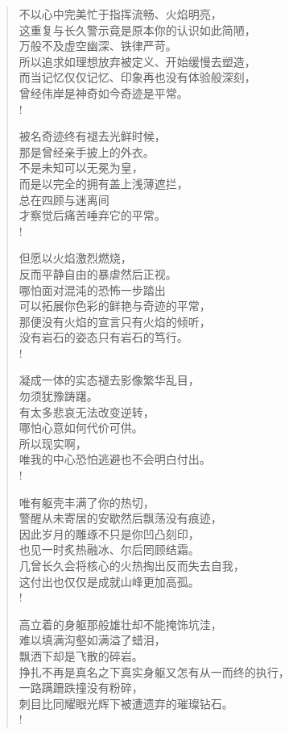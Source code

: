 \documentclass[UTF8, 12pt, a4paper]{ctexrep} %
\begin{document}
\begin{verse}

    不以心中完美忙于指挥流畅、火焰明亮，\\
    这重复与长久警示竟是原本你的认识如此简陋，\\
    万般不及虚空幽深、铁律严苛。\\
    所以追求如理想放弃被定义、开始缓慢去塑造，\\
    而当记忆仅仅记忆、印象再也没有体验般深刻，\\
    曾经伟岸是神奇如今奇迹是平常。\\!

    被名奇迹终有褪去光鲜时候，\\
    那是曾经亲手披上的外衣。\\
    不是未知可以无冕为皇，\\
    而是以完全的拥有盖上浅薄遮拦，\\
    总在四顾与迷离间\\
    才察觉后痛苦唾弃它的平常。\\!

    但愿以火焰激烈燃烧，\\
    反而平静自由的暴虐然后正视。\\
    哪怕面对混沌的恐怖一步踏出\\
    可以拓展你色彩的鲜艳与奇迹的平常，\\
    那便没有火焰的宣言只有火焰的倾听，\\
    没有岩石的姿态只有岩石的笃行。\\!

    凝成一体的实态褪去影像繁华乱目，\\
    勿须犹豫踌躇。\\
    有太多悲哀无法改变逆转，\\
    哪怕心意如何代价可供。\\
    所以现实啊，\\
    唯我的中心恐怕逃避也不会明白付出。\\!

    唯有躯壳丰满了你的热切，\\
    警醒从未寄居的安歇然后飘荡没有痕迹，\\
    因此岁月的雕琢不只是你凹凸刻印，\\
    也见一时炙热融冰、尔后罔顾结霜。\\
    几曾长久会将核心的火热掏出反而失去自我，\\
    这付出也仅仅是成就山峰更加高孤。\\!

    高立着的身躯那般雄壮却不能掩饰坑洼，\\
    难以填满沟壑如满溢了蜡泪，\\
    飘洒下却是飞散的碎岩。\\
    挣扎不再是真名之下真实身躯又怎有从一而终的执行，\\
    一路蹒跚跌撞没有粉碎，\\
    刺目比同耀眼光辉下被遭遗弃的璀璨钻石。\\!


\end{verse}
\end{document}
